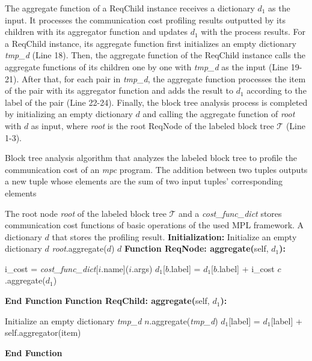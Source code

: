 The aggregate function of a ReqChild instance receives a dictionary $d_1$ as the input. It processes the communication cost profiling results outputted by its children with its aggregator function and updates $d_1$ with the process results.  For a ReqChild instance, its aggregate function first initializes an empty dictionary \textit{tmp\_d} (Line 18). Then, the aggregate function of the ReqChild instance calls the aggregate functions of its children one by one with \textit{tmp\_d} as the input (Line 19-21). After that, for each pair in \textit{tmp\_d}, the aggregate function processes the item of the pair with its aggregator function and adds the result to $d_1$ according to the label of the pair (Line 22-24). Finally, the block tree analysis process is completed by initializing an empty dictionary $d$ and calling the aggregate function of \textit{root} with $d$ as input, where \textit{root} is the root ReqNode of the labeled block tree $\mathcal{T}$ (Line 1-3).
\begin{algorithm}[htbp]
\small
\caption{Block tree analysis algorithm that analyzes the labeled block tree to profile the communication cost of an \textit{mpc} program. The addition between two tuples outputs a new tuple whose elements are the sum of two input tuples' corresponding elements}
\label{alg:block_analysisl}
 \begin{algorithmic}[1]
    \REQUIRE The root node \textit{root} of the labeled block tree $\mathcal{T}$ and a \textit{cost\_func\_dict} stores communication cost functions of basic operations of the used MPL framework.
    \ENSURE A dictionary $d$ that stores the profiling result.
    \STATE \textbf{Initialization:}  Initialize an empty dictionary $d$
    \STATE \textit{root}.aggregate($d$)
    \RETURN $d$
    \STATE\textbf{Function ReqNode: aggregate(}self, $d_1$\textbf{):}
    \begin{ALC@g}
          \STATE  i\_cost = \textit{cost\_func\_dict}[$i$.name]($i$.args) 
            \STATE   $d_1$[$b$.label] = $d_1$[$b$.label] + i\_cost
        \ENDIF
    \ENDFOR
    \ENDFOR
      \STATE  $c$.aggregate($d_1$)
    \ENDFOR
    \end{ALC@g}
    \STATE \textbf{End Function}
    \STATE\textbf{Function ReqChild: aggregate(}self, $d_1$\textbf{):}
    \begin{ALC@g}
    \STATE Initialize an empty dictionary \textit{tmp\_d}
      \STATE  $n$.aggregate(\textit{tmp\_d})
    \ENDFOR
            \STATE   $d_1$[label] =  $d_1$[label] + self.aggregator(item)
    \ENDFOR
    \end{ALC@g} 
    \STATE \textbf{End Function}
\end{algorithmic}
\end{algorithm}



